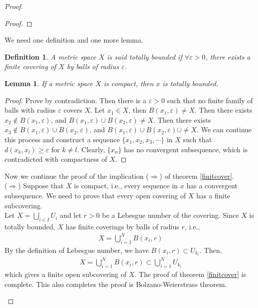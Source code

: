 \documentclass[12pt,leqno]{amsart}
\newtheorem{definition}{Definition}[section]
\newtheorem{lemma}[theorem]{Lemma}
\theoremstyle{definition}
\numberwithin{equation}{subsection}
\begin{document}
\begin{proof}
\begin{enumerate}
\begin{proof}
    \end{proof}
    We need one definition and one more lemma.
    \begin{definition}
    A metric space $X$ is said totally bounded if $\forall \varepsilon>0$, there exists a finite covering of $X$ by balls of radius $\varepsilon$.
    \end{definition}
    \begin{lemma}
    If a metric space $X$ is compact, then $x$ is totally bounded.
    \end{lemma}
    \begin{proof}Prove by contradiction. Then there is a $\varepsilon>0$ such that no finite family of balls with radius $\varepsilon$ covers $X$. Let $x_1\in X$, then $B(x_1,\varepsilon)\neq X$. Then there exists $x_2\notin B(x_1,\varepsilon)$, and $B(x_1,\varepsilon)\cup B(x_2,\varepsilon)\neq X$. Then there exists $x_3\notin B(x_1,\varepsilon)\cup B(x_2,\varepsilon)$, and $B(x_1,\varepsilon)\cup B(x_2,\varepsilon)\cup\neq X$. We can continue this process and construct a sequence $\{x_1,x_2,x_3,\cdots\}$ in $X$ such that $d(x_k,x_l)\geq \varepsilon$ for $k\neq l$. Clearly, $\{x_n\}$ has no convergent subsequence, which is contradicted with compactness of $X$.
    \end{proof}
    Now we continue the proof of the implication ($\Rightarrow$) of theorem \ref{finitcover}. \\
    ($\Rightarrow$) Suppose that $X$ is compact, i.e., every sequence in $x$ has a convergent subsequence. We need to prove that every open covering of $X$ has a finite subcovering. \\
    Let $X = \bigcup_{i\in I}U_i$ and let $r>0$ be a Lebesgue number of the covering. Since $X$ is totally bounded, $X$ has finite coverings by balls of radius $r$, i.e.,
    \begin{align*}
        X = \bigcup^N_{i=1}B(x_i,r)
    \end{align*}
    By the definition of Lebesgue number, we have $B(x_i,r)\subset U_{k_i}$. Then,
    \begin{align*}
        X = \bigcup^N_{i=1}B(x_i,r) \subset \bigcup^N_{i=1}U_{k_i}
    \end{align*}
    which gives a finite open subcovering of $X$. The proof of theorem \ref{finitcover} is complete. This also completes the proof is Bolzano-Weierstrass theorem.
\end{enumerate}
\end{proof}

\medskip
\end{document}
